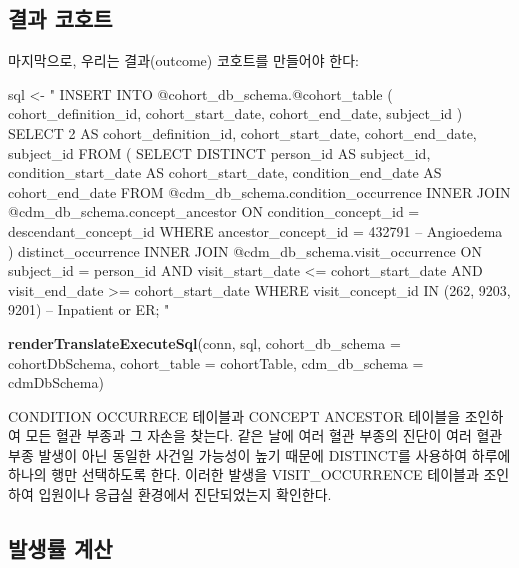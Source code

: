 \documentclass[11pt]{book}
\newenvironment{Shaded}{\begin{snugshade}}{\end{snugshade}}
\newcommand{\KeywordTok}[1]{\textcolor[rgb]{0.13,0.29,0.53}{\textbf{#1}}}
\newcommand{\DataTypeTok}[1]{\textcolor[rgb]{0.13,0.29,0.53}{#1}}
\newcommand{\StringTok}[1]{\textcolor[rgb]{0.31,0.60,0.02}{#1}}
\newcommand{\NormalTok}[1]{#1}
\theoremstyle{definition}
\theoremstyle{definition}
\theoremstyle{definition}
\theoremstyle{remark}
\begin{document}
\subsection{결과 코호트}\label{-}

마지막으로, 우리는 결과(outcome) 코호트를 만들어야 한다:

\begin{Shaded}
\begin{Highlighting}[]
\NormalTok{sql <-}\StringTok{ "}
\StringTok{INSERT INTO @cohort_db_schema.@cohort_table (}
\StringTok{ cohort_definition_id,}
\StringTok{ cohort_start_date,}
\StringTok{ cohort_end_date,}
\StringTok{subject_id}
\StringTok{)}
\StringTok{SELECT 2 AS cohort_definition_id,}
\StringTok{  cohort_start_date,}
\StringTok{  cohort_end_date,}
\StringTok{  subject_id}
\StringTok{FROM (}
\StringTok{  SELECT DISTINCT person_id AS subject_id,}
\StringTok{    condition_start_date AS cohort_start_date,}
\StringTok{    condition_end_date AS cohort_end_date}
\StringTok{  FROM @cdm_db_schema.condition_occurrence}
\StringTok{  INNER JOIN @cdm_db_schema.concept_ancestor}
\StringTok{    ON condition_concept_id = descendant_concept_id}
\StringTok{  WHERE ancestor_concept_id = 432791 -- Angioedema}
\StringTok{) distinct_occurrence}
\StringTok{INNER JOIN @cdm_db_schema.visit_occurrence}
\StringTok{  ON subject_id = person_id}
\StringTok{  AND visit_start_date <= cohort_start_date}
\StringTok{  AND visit_end_date >= cohort_start_date}
\StringTok{WHERE visit_concept_id IN (262, 9203,}
\StringTok{    9201) -- Inpatient or ER;}
\StringTok{"}

\KeywordTok{renderTranslateExecuteSql}\NormalTok{(conn, sql,}
                          \DataTypeTok{cohort_db_schema =}\NormalTok{ cohortDbSchema,}
                          \DataTypeTok{cohort_table =}\NormalTok{ cohortTable,}
                          \DataTypeTok{cdm_db_schema =}\NormalTok{ cdmDbSchema)}
\end{Highlighting}
\end{Shaded}

CONDITION OCCURRECE 테이블과 CONCEPT ANCESTOR 테이블을 조인하여 모든
혈관 부종과 그 자손을 찾는다. 같은 날에 여러 혈관 부종의 진단이 여러
혈관 부종 발생이 아닌 동일한 사건일 가능성이 높기 때문에 DISTINCT를
사용하여 하루에 하나의 행만 선택하도록 한다. 이러한 발생을
VISIT\_OCCURRENCE 테이블과 조인하여 입원이나 응급실 환경에서
진단되었는지 확인한다.

\subsection{발생률 계산}\label{-}
\end{document}
